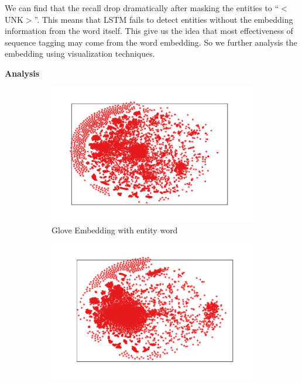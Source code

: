 \documentclass{article}
\begin{document}
We can find that the recall drop dramatically after masking the entities to ``$<$UNK$>$''. This means that LSTM fails to detect entities without the embedding information from the word itself. This give us the idea that most effectiveness of sequence tagging may come from the word embedding. So we further analysis the embedding using visualization techniques.

\noindent \textbf{Analysis}

\begin{figure}[t]
	\centering
	\begin{subfigure}[t]{0.24\textwidth}
		\includegraphics[width=\linewidth]{glove_embedding_positive_mirror.pdf}
		\caption{Glove Embedding with entity word}
		\label{fig:glove_positive}
	\end{subfigure} \hfil 
	\begin{subfigure}[t]{0.24\textwidth}
		\includegraphics[width=\linewidth]{bi_lstm_gold_positive.pdf}

\end{subfigure}
\end{figure}
\end{document}
